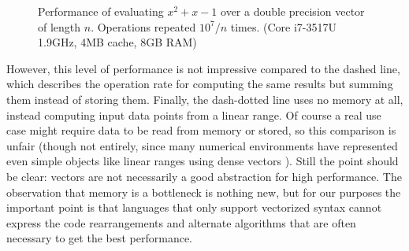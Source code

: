 {\begin{figure}[!t]

\caption{
  Performance of evaluating $x^2+x-1$ over a double precision vector of length $n$.
  Operations repeated $10^7/n$ times. (Core i7-3517U 1.9GHz, 4MB cache, 8GB RAM)
}
\label{fig:vecperf}
\end{figure}

However, this level of performance is not impressive compared to the
dashed line, which describes the operation rate for computing the
same results but summing them instead of storing them.
Finally, the dash-dotted line uses no memory at all, instead computing
input data points from a linear range.
Of course a real use case might require data to be read from memory or stored,
so this comparison is unfair (though not entirely, since many numerical
environments have represented even simple objects like linear ranges using
dense vectors \cite{matlabman:linspace}).
Still the point should be clear: vectors are not necessarily a good abstraction
for high performance.
The observation that memory is a bottleneck is nothing new, but for our purposes
the important point is that languages that only support vectorized syntax
cannot express the code rearrangements and alternate algorithms that are often
necessary to get the best performance.

}
